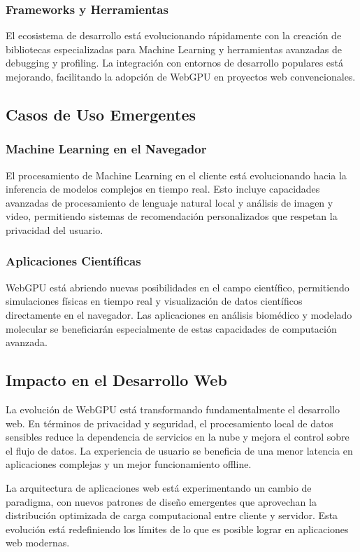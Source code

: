\subsubsection{Frameworks y Herramientas}
El ecosistema de desarrollo está evolucionando rápidamente con la creación de bibliotecas especializadas para Machine Learning y herramientas avanzadas de debugging y profiling. La integración con entornos de desarrollo populares está mejorando, facilitando la adopción de WebGPU en proyectos web convencionales.

\subsection{Casos de Uso Emergentes}
\label{subsec:emerging-uses}

\subsubsection{Machine Learning en el Navegador}
El procesamiento de Machine Learning en el cliente está evolucionando hacia la inferencia de modelos complejos en tiempo real. Esto incluye capacidades avanzadas de procesamiento de lenguaje natural local y análisis de imagen y video, permitiendo sistemas de recomendación personalizados que respetan la privacidad del usuario.

\subsubsection{Aplicaciones Científicas}
WebGPU está abriendo nuevas posibilidades en el campo científico, permitiendo simulaciones físicas en tiempo real y visualización de datos científicos directamente en el navegador. Las aplicaciones en análisis biomédico y modelado molecular se beneficiarán especialmente de estas capacidades de computación avanzada.

\subsection{Impacto en el Desarrollo Web}
\label{subsec:web-development-impact}

La evolución de WebGPU está transformando fundamentalmente el desarrollo web. En términos de privacidad y seguridad, el procesamiento local de datos sensibles reduce la dependencia de servicios en la nube y mejora el control sobre el flujo de datos. La experiencia de usuario se beneficia de una menor latencia en aplicaciones complejas y un mejor funcionamiento offline.

La arquitectura de aplicaciones web está experimentando un cambio de paradigma, con nuevos patrones de diseño emergentes que aprovechan la distribución optimizada de carga computacional entre cliente y servidor. Esta evolución está redefiniendo los límites de lo que es posible lograr en aplicaciones web modernas.